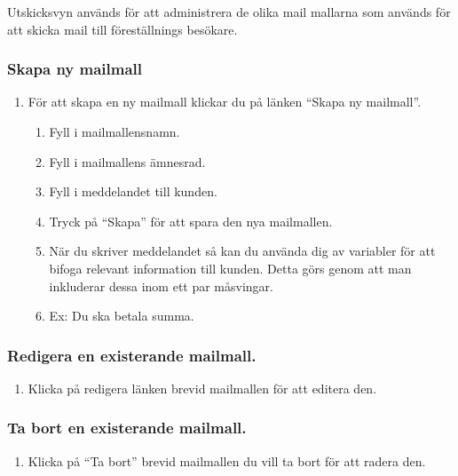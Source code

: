 \documentclass[a4paper, twoside, 11pt, titlepage]{article}
\begin{document}
	Utskicksvyn används för att administrera de olika mail mallarna som används för att skicka mail till föreställnings besökare.

		\subsubsection{Skapa ny mailmall}


		\begin{enumerate}
		\item För att skapa en ny mailmall klickar du på länken ``Skapa ny mailmall''.

		\begin{enumerate}
		\item Fyll i mailmallensnamn.

		\item Fyll i mailmallens ämnesrad.

		\item Fyll i meddelandet till kunden.

		\item Tryck på ``Skapa'' för att spara den nya mailmallen.

		\item När du skriver meddelandet så kan du använda dig av variabler för att bifoga relevant information till kunden. Detta görs genom att man inkluderar dessa inom ett par måsvingar.

		\item Ex: Du ska betala {summa}.
		\end{enumerate}
		\end{enumerate}

		\subsubsection{Redigera en existerande mailmall.}


		\begin{enumerate}
		\item Klicka på redigera länken brevid mailmallen för att editera den.
		\end{enumerate}

		\subsubsection{Ta bort en existerande mailmall.}


		\begin{enumerate}
		\item Klicka på ``Ta bort'' brevid mailmallen du vill ta bort för att radera den.
		\end{enumerate}
\end{document}
